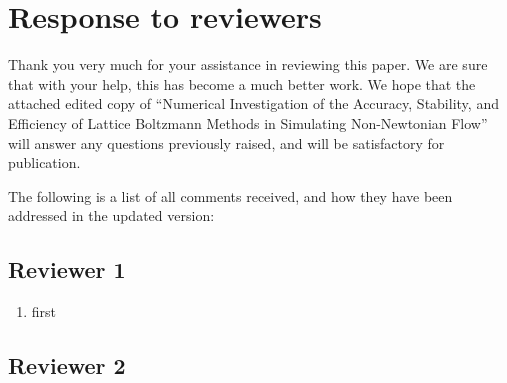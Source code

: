 \documentclass{article}
\begin{document}
	
	
\section*{Response to reviewers}

Thank you very much for your assistance in reviewing this paper. We are sure that with your help, this has become a much better work. We hope that the attached edited copy of ``Numerical Investigation of the Accuracy, Stability, and Efficiency of Lattice Boltzmann Methods in Simulating Non-Newtonian Flow'' will answer any questions previously raised, and will be satisfactory for publication.

The following is a list of all comments received, and how they have been addressed in the updated version:

  \subsection*{Reviewer 1}
	\begin{enumerate}
		\item first
	
	\end{enumerate}

	\subsection*{Reviewer 2}
	
\end{document}
